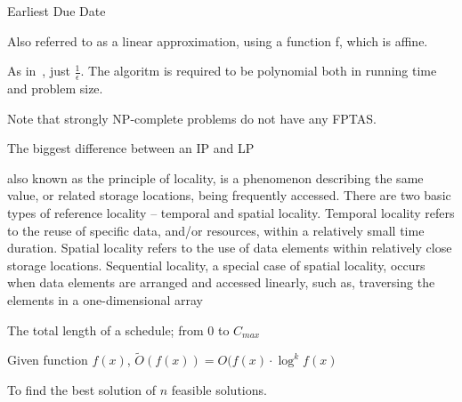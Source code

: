 \begin{definition}[EDD]\label{EDD}
    Earliest Due Date
\end{definition}

\begin{definition}[F-approximation]
    Also referred to as a linear approximation, using a function f,
    which is affine.
\end{definition}

\begin{definition}\label{FPTAS}
    As in~, just $\frac{1}{\epsilon}$.
    The algoritm is required to be polynomial both in running time and problem
    size.

    Note that strongly NP-complete problems do not have any FPTAS.
\end{definition}

\begin{definition}\label{integralitygap}
    The biggest difference between an IP and LP
\end{definition}

\begin{definition}
     also known as the principle of locality, is a phenomenon describing the
     same value, or related storage locations, being frequently accessed. There
     are two basic types of reference locality – temporal and spatial locality.
     Temporal locality refers to the reuse of specific data, and/or resources,
     within a relatively small time duration. Spatial locality refers to the
     use of data elements within relatively close storage locations. Sequential
     locality, a special case of spatial locality, occurs when data elements
     are arranged and accessed linearly, such as, traversing the elements in a
     one-dimensional array

\end{definition}

\begin{definition}[Makespan]
    The total length of a schedule; from 0 to $C_{max}$
\end{definition}

\begin{definition}[$\tilde{O}$]\label{otilde}
    Given function $f(x)$, $\tilde{O}(f(x)) = O(f(x)\cdot{\log^{k}{f(x)}}$
\end{definition}

\begin{definition}\label{optproblem}
    To find the best solution of $n$ feasible solutions.
\end{definition}

